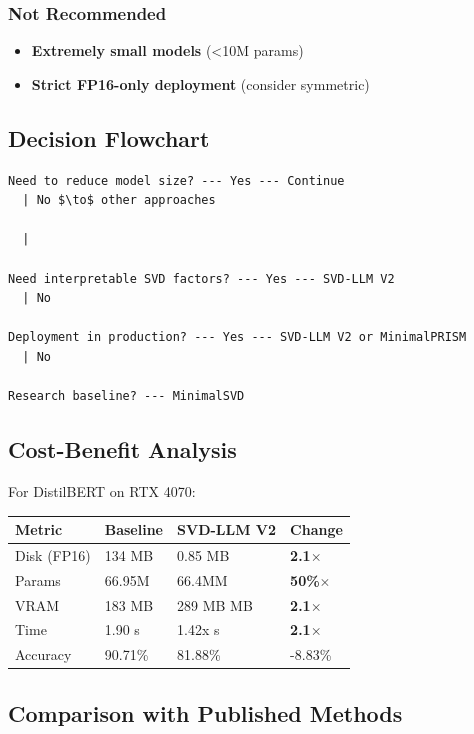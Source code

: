 \subsubsection{Not Recommended}

\begin{itemize}
\item \textbf{Extremely small models} (\textless{}10M params)
\item \textbf{Strict FP16-only deployment} (consider symmetric)

\end{itemize}
\subsection{Decision Flowchart}

\begin{lstlisting}
Need to reduce model size? --- Yes --- Continue
  | No $\to$ other approaches

  |
   
Need interpretable SVD factors? --- Yes --- SVD-LLM V2
  | No
   
Deployment in production? --- Yes --- SVD-LLM V2 or MinimalPRISM
  | No
   
Research baseline? --- MinimalSVD
\end{lstlisting}

\subsection{Cost-Benefit Analysis}

For DistilBERT on RTX 4070:

\begin{table}[H]
\centering
\small
\begin{tabular}{llll}
\toprule
\textbf{Metric} & \textbf{Baseline} & \textbf{SVD-LLM V2} & \textbf{Change} \\
\midrule
Disk (FP16) & 134 MB & 0.85 MB & \textbf{2.1$\times$} \\
Params & 66.95M & 66.4MM & \textbf{50\%$\times$} \\
VRAM & 183 MB & 289 MB MB & \textbf{2.1$\times$} \\
Time & 1.90 s & 1.42x s & \textbf{2.1$\times$} \\
Accuracy & 90.71\% & 81.88\% & -8.83\% \\
\bottomrule
\end{tabular}
\end{table}

\subsection{Comparison with Published Methods}

